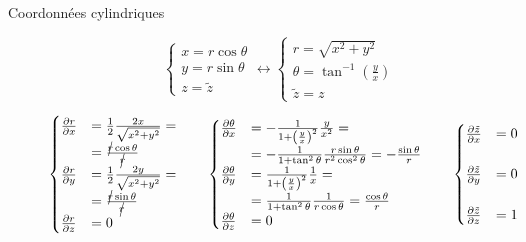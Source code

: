 \documentclass
[
a4paper,                      %
twoside,					  %
12pt,                         %
abstract,		      %
fleqn,                        %
]
{scrartcl} %
\begin{document}
\begin{description}
\item[Coordonn\'ees cylindriques]

\begin{equation}
\begin{cases}
x=r\cos{\theta}\\
y=r\sin{\theta}\\
z=\tilde{z}
\end{cases}\longleftrightarrow\begin{cases}
r=\sqrt{x^{2}+y^{2}}\\
\theta=\tan^{-1}\left(\frac{y}{x}\right)\\
\tilde{z}=z
\end{cases}
\end{equation}

\begin{equation}
\begin{cases}
\frac{\partial r}{\partial x}&=\frac{1}{2}\frac{2x}{\sqrt{x^{2}+y^{2}}}=\\&=\frac{\cancel{r}\cos{\theta}}{\cancel{r}}\\
\frac{\partial r}{\partial y}&=\frac{1}{2}\frac{2y}{\sqrt{x^{2}+y^{2}}}=\\&=\frac{\cancel{r}\sin{\theta}}{\cancel{r}}\\
\frac{\partial r}{\partial z}&=0\\
\end{cases}\qquad\begin{cases}
\frac{\partial \theta}{\partial x}&=-\frac{1}{1+\left(\frac{y}{x}\right)^{2}}\frac{y}{x^{2}}=\\&=-\frac{1}{1+\tan^{2}{\theta}}\frac{r\sin{\theta}}{r^{2}\cos^{2}{\theta}}=-\frac{\sin{\theta}}{r}\\
\frac{\partial \theta}{\partial y}&=\frac{1}{1+\left(\frac{y}{x}\right)^{2}}\frac{1}{x}=\\&=\frac{1}{1+\tan^{2}{\theta}}\frac{1}{r\cos{\theta}}=\frac{\cos{\theta}}{r}\\
\frac{\partial \theta}{\partial z}&=0\\
\end{cases}\qquad\begin{cases}
\frac{\partial \tilde{z}}{\partial x}&=0\\&\\
\frac{\partial \tilde{z}}{\partial y}&=0\\&\\
\frac{\partial \tilde{z}}{\partial z}&=1\\
\end{cases}
\end{equation}


\end{description}
\end{document}
